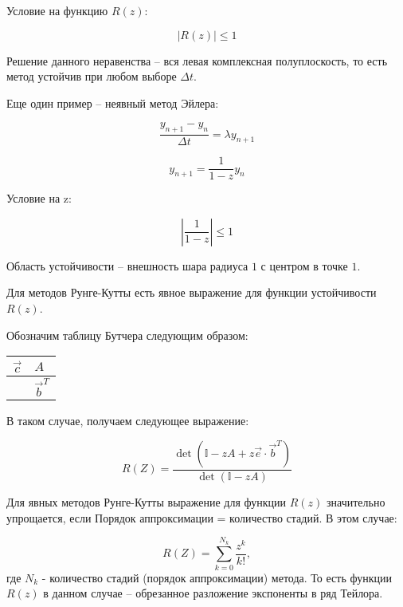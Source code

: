\documentclass[10pt,a4paper]{article}
\begin{document}
		Условие на функцию $R\left(z\right)$:
		
		\begin{equation}
			\left|R\left(z\right)\right|\leqslant 1
		\end{equation}
		
		Решение данного неравенства -- вся левая комплексная полуплоскость, то 
		есть метод устойчив при любом выборе $\Delta t$.
		
		Еще один пример -- неявный метод Эйлера:
		
		\begin{equation}
			\frac{y_{n + 1} - y_{n}}{\Delta t} = \lambda y_{n + 1}
		\end{equation}
		
		\begin{equation}
			y_{n + 1} = \frac{1}{1 - z}y_{n}
		\end{equation}
		
		Условие на z:
		
		\begin{equation}
			\left|\frac{1}{1 - z}\right| \leqslant 1
		\end{equation}
		
		Область устойчивости -- внешность шара радиуса $1$ с центром в точке 
		$1$.
		
		Для методов Рунге-Кутты есть явное выражение для функции устойчивости 
		$R(z)$.
		
		Обозначим таблицу Бутчера следующим образом:
		
		\begin{table}[h!]
\centering
\begin{tabular}{l|l}
 $\vec{c}$ & $A$       \\ \hline
\vspace{1mm} &\vspace{1mm} $\vec{b}^T$
\end{tabular}
\end{table}

 		В таком случае, получаем следующее выражение:
 		
 		\begin{equation}
 			R\left(Z\right) = \frac{\det\left(\mathbb{I} - zA + z\vec{e}\cdot
 			\vec{b}^{T}\right)}{\det\left(\mathbb{I} - zA\right)}
 		\end{equation}
 		
 		Для явных методов Рунге-Кутты выражение для функции $R(z)$ значительно 
 		упрощается, если Порядок аппроксимации = количество стадий. В этом 
 		случае:
 		
 		\begin{equation}
 			R\left(Z\right) = \sum\limits_{k = 0}^{N_{k}}\frac{z^{k}}{k!},
 		\end{equation} 
 		где $N_k$ - количество стадий (порядок аппроксимации) метода. То есть 
 		функции $R(z)$ в данном случае -- обрезанное разложение экспоненты в ряд 
 		Тейлора.
 		
\end{document}
